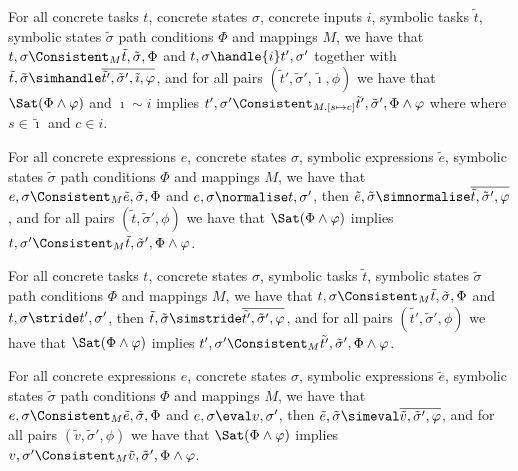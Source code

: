 \begin{lemma}
  \label{lem:completeHandle}
  For all concrete tasks $t$, concrete states $\sigma$, concrete inputs $i$, symbolic tasks $\tilde{t}$, symbolic states $\tilde{\sigma}$ path conditions $\Phi$ and mappings $M$,
  we have that $t,\sigma\Consistent_{M}\tilde{t},\tilde{\sigma},\Phi$ and
  $t,\sigma\handle{i}t',\sigma'$ together with
  $\tilde{t},\tilde{\sigma}\simhandle\overline{\tilde{t}',\tilde{\sigma}',\tilde{\imath},\phi}$,
  and for all pairs $(\tilde{t}',\tilde{\sigma}',\tilde{\imath},\phi)$ we have that $\Sat(\Phi\land\phi)$ and $\imath\sim i$ implies $t',\sigma'\Consistent_{M.[s\mapsto c]}\tilde{t}',\tilde{\sigma}',\Phi\land\phi$ where where $s\in\tilde{\imath}$ and $c\in i$.
\end{lemma}

\begin{lemma}
  \label{lem:completeNormalise}
  For all concrete expressions $e$, concrete states $\sigma$, symbolic expressions $\tilde{e}$, symbolic states $\tilde{\sigma}$ path conditions $\Phi$ and mappings $M$,
  we have that $e,\sigma\Consistent_{M}\tilde{e},\tilde{\sigma},\Phi$
  and $e,\sigma\normalise t,\sigma'$,
  then $\tilde{e},\tilde{\sigma}\simnormalise\overline{\tilde{t},\tilde{\sigma}',\phi}$,
  and for all pairs $(\tilde{t},\tilde{\sigma}',\phi)$ we have that $\Sat(\Phi\land\phi)$ implies $t,\sigma'\Consistent_{M}\tilde{t},\tilde{\sigma}',\Phi\land\phi$.
\end{lemma}

\begin{lemma}
  \label{lem:completeStride}
  For all concrete tasks $t$, concrete states $\sigma$, symbolic tasks $\tilde{t}$, symbolic states $\tilde{\sigma}$ path conditions $\Phi$ and mappings $M$,
  we have that $t,\sigma\Consistent_{M}\tilde{t},\tilde{\sigma},\Phi$
  and $t,\sigma\stride t',\sigma'$,
  then $\tilde{t},\tilde{\sigma}\simstride\overline{\tilde{t'},\tilde{\sigma}',\phi}$,
  and for all pairs $(\tilde{t'},\tilde{\sigma}',\phi)$ we have that $\Sat(\Phi\land\phi)$ implies $t',\sigma'\Consistent_{M}\tilde{t'},\tilde{\sigma}',\Phi\land\phi$.
\end{lemma}

\begin{lemma}
  \label{lem:completeEval}
  For all concrete expressions $e$, concrete states $\sigma$, symbolic expressions $\tilde{e}$, symbolic states $\tilde{\sigma}$ path conditions $\Phi$ and mappings $M$,
  we have that $e,\sigma\Consistent_{M}\tilde{e},\tilde{\sigma},\Phi$
  and $e,\sigma\eval v,\sigma'$,
  then $\tilde{e},\tilde{\sigma}\simeval\overline{\tilde{v},\tilde{\sigma}',\phi}$,
  and for all pairs $(\tilde{v},\tilde{\sigma}',\phi)$ we have that $\Sat(\Phi\land\phi)$ implies $v,\sigma'\Consistent_{M}\tilde{v},\tilde{\sigma}',\Phi\land\phi$.
\end{lemma}

